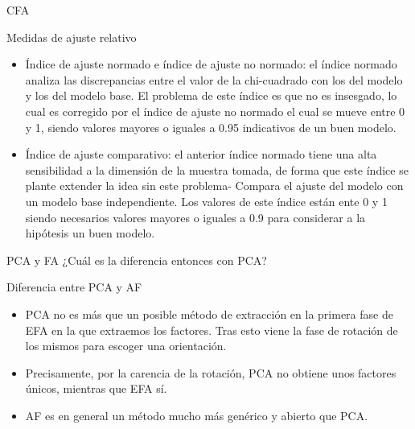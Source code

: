 \documentclass[10pt]{beamer}
\begin{document}
\begin{frame}[fragile]{CFA}
\vspace{10px}
\begin{block}{Medidas de ajuste relativo}
	\begin{itemize}
		\item Índice de ajuste normado e índice de ajuste no normado: el índice normado analiza las discrepancias entre el valor de la chi-cuadrado con los del modelo y los del modelo base. El problema de este índice es que no es insesgado, lo cual es corregido por el índice de ajuste no normado el cual se mueve entre 0 y 1, siendo valores mayores o iguales a 0.95 indicativos de un buen modelo.
		\item Índice de ajuste comparativo: el anterior índice normado tiene una alta sensibilidad a la dimensión de la muestra tomada, de forma que este índice se plante extender la idea sin este problema- Compara el ajuste del modelo con un modelo base independiente. Los valores de este índice están ente 0 y 1 siendo necesarios valores mayores o iguales a 0.9 para considerar a la hipótesis un buen modelo.
	\end{itemize}
\end{block}
\end{frame}

\begin{frame}[fragile]{PCA y FA}
¿Cuál es la diferencia entonces con PCA?
\vspace{10px}
\begin{alertblock}{Diferencia entre PCA y AF}
	\begin{itemize}
		\item PCA no es más que un posible método de extracción en la primera fase de EFA en la que extraemos los factores. Tras esto viene la fase de rotación de los mismos para escoger una orientación.
		\item Precisamente, por la carencia de la rotación, PCA no obtiene unos factores únicos, mientras que EFA sí. 
		\item AF es en general un método mucho más genérico y abierto que PCA.
	\end{itemize}
\end{alertblock}
\end{frame}

\end{document}

